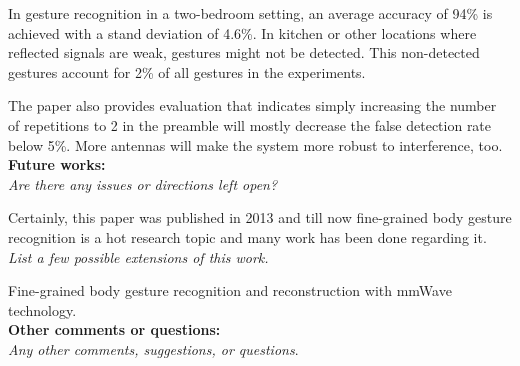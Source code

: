 \documentclass[11pt, oneside]{article}   	%
\begin{document}
In gesture recognition in a two-bedroom setting, an average accuracy of 94\% is achieved with a stand deviation of 4.6\%. In kitchen or other locations where reflected signals are weak, gestures might not be detected. This non-detected gestures account for 2\% of all gestures in the experiments.

The paper also provides evaluation that indicates simply increasing the number of repetitions to 2 in the preamble will mostly decrease the false detection rate below 5\%.  More antennas will make the system more robust to interference, too.\\


\noindent \textbf{Future works:}\\
\emph{Are there any issues or directions left open?}

Certainly, this paper was published in 2013 and till now fine-grained body gesture recognition is a hot research topic and many work has been done regarding it.\\

\noindent \emph{List a few possible extensions of this work.}

Fine-grained body gesture recognition and reconstruction with mmWave technology.\\


\noindent \textbf{Other comments or questions:}\\
\emph{Any other comments, suggestions, or questions}.
\end{document}
